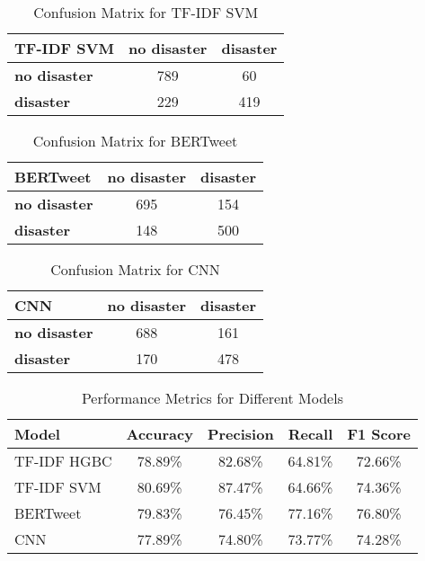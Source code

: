 \documentclass[10pt,table]{article}
\begin{document}
\begin{table}[h]
    \centering
    \begin{tabular}{lcc}
    \hline
    \textbf{TF-IDF SVM} & \textbf{no disaster} & \textbf{disaster} \\ \hline
    \textbf{no disaster} & 789                   & 60               \\
    \textbf{disaster}    & 229                   & 419              \\ \hline
    \end{tabular}
    \caption{Confusion Matrix for TF-IDF SVM}
\end{table}


\begin{table}[h]
    \centering
    \begin{tabular}{lcc}
    \hline
    \textbf{BERTweet} & \textbf{no disaster} & \textbf{disaster} \\ \hline
    \textbf{no disaster} & 695                   & 154              \\
    \textbf{disaster}    & 148                   & 500              \\ \hline
    \end{tabular}
    \caption{Confusion Matrix for BERTweet}
\end{table}


\begin{table}[h]
    \centering
    \begin{tabular}{lcc}
    \hline
    \textbf{CNN} & \textbf{no disaster} & \textbf{disaster} \\ \hline
    \textbf{no disaster} & 688                   & 161              \\
    \textbf{disaster}    & 170                   & 478              \\ \hline
    \end{tabular}
    \caption{Confusion Matrix for CNN}
\end{table}


\begin{table}[h]
    \centering
    \begin{tabular}{lcccc}
    \hline
    \textbf{Model}       & \textbf{Accuracy} & \textbf{Precision} & \textbf{Recall} & \textbf{F1 Score} \\ \hline
    TF-IDF HGBC  & 78.89\%  & 82.68\%    & 64.81\% & 72.66\%  \\
    TF-IDF SVM   & 80.69\%  & 87.47\%    & 64.66\% & 74.36\%  \\
    BERTweet     & 79.83\%  & 76.45\%    & 77.16\% & 76.80\%  \\
    CNN          & 77.89\%  & 74.80\%    & 73.77\% & 74.28\%  \\ \hline
    \end{tabular}
    \caption{Performance Metrics for Different Models}
\end{table}
    
\end{document}

